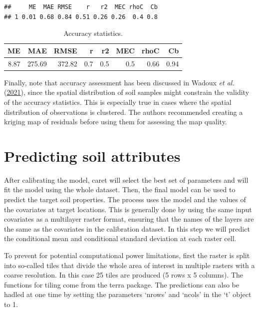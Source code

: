 \documentclass[
  10pt,
  b5paper,
  oneside]{book}
\begin{document}
\begin{verbatim}
##     ME  MAE RMSE    r   r2  MEC rhoC  Cb
## 1 0.01 0.68 0.84 0.51 0.26 0.26  0.4 0.8
\end{verbatim}

\begin{table}

\caption{\label{tab:unnamed-chunk-28}Accuracy statistics.}
\centering
\begin{tabular}[t]{rrrrrrrr}
\toprule
ME & MAE & RMSE & r & r2 & MEC & rhoC & Cb\\
\midrule
8.87 & 275.69 & 372.82 & 0.7 & 0.5 & 0.5 & 0.66 & 0.94\\
\bottomrule
\end{tabular}
\end{table}

Finally, note that accuracy assessment has been discussed in Wadoux \emph{et al.} (\protect\hyperlink{ref-Wadoux2021}{2021}), since the spatial distribution of soil samples might constrain the validity of the accuracy statistics. This is especially true in cases where the spatial distribution of observations is clustered. The authors recommended creating a kriging map of residuals before using them for assessing the map quality.

\hypertarget{predicting-soil-attributes}{%
\section{Predicting soil attributes}\label{predicting-soil-attributes}}

After calibrating the model, caret will select the best set of parameters and will fit the model using the whole dataset. Then, the final model can be used to predict the target soil properties. The process uses the model and the values of the covariates at target locations. This is generally done by using the same input covariates as a multilayer raster format, ensuring that the names of the layers are the same as the covariates in the calibration dataset. In this step we will predict the conditional mean and conditional standard deviation at each raster cell.

To prevent for potential computational power limitations, first the raster is split into so-called tiles that divide the whole area of interest in multiple rasters with a coarse resolution. In this case 25 tiles are produced (5 rows x 5 columns). The functions for tiling come from the terra package. The predictions can also be hadled at one time by setting the parameters `nrows' and `ncols' in the `t' object to 1.
\end{document}
